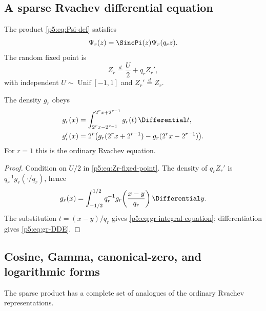 \documentclass[11pt]{article}
\theoremstyle{definition}
\theoremstyle{remark}
\begin{document}
\subsection{A sparse Rvachev differential equation}

The product \eqref{p5:eq:Psi-def} satisfies
\begin{equation}
 \Psi_r(z)=\SincPi(z)\Psi_r(q_rz).                          \label{p5:eq:Psi-refinement}
\end{equation}
The random fixed point is
\begin{equation}
 Z_r\overset{d}=\frac{U}{2}+q_rZ_r',                        \label{p5:eq:Zr-fixed-point}
\end{equation}
with independent $U\sim\operatorname{Unif}[-1,1]$ and
$Z_r'\overset d=Z_r$.

\begin{proposition}
\label{p5:prop:sparse-DDE}
The density $g_r$ obeys
\begin{align}
 g_r(x)
 &=\int_{2^rx-2^{r-1}}^{2^rx+2^{r-1}}g_r(t)\,\Differential t,        \label{p5:eq:gr-integral-equation}\\
 g_r'(x)
 &=2^r\bigl(g_r(2^rx+2^{r-1})-g_r(2^rx-2^{r-1})\bigr).     \label{p5:eq:gr-DDE}
\end{align}
For $r=1$ this is the ordinary Rvachev equation.
\end{proposition}

\begin{proof}
Condition on $U/2$ in \eqref{p5:eq:Zr-fixed-point}.  The density of $q_rZ_r'$ is
$q_r^{-1}g_r(\cdot/q_r)$, hence
\[
 g_r(x)=\int_{-1/2}^{1/2}q_r^{-1}
 g_r\!\left(\frac{x-y}{q_r}\right)\Differential y.
\]
The substitution $t=(x-y)/q_r$ gives
\eqref{p5:eq:gr-integral-equation}; differentiation gives
\eqref{p5:eq:gr-DDE}.
\end{proof}

\subsection{Cosine, Gamma, canonical-zero, and logarithmic forms}

The sparse product has a complete set of analogues of the ordinary Rvachev
representations.
\end{document}
